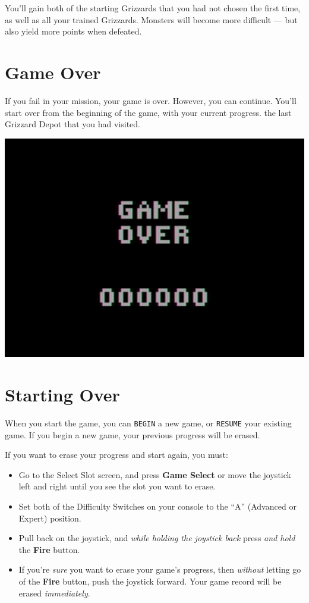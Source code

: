 \documentclass[9pt,twocolumn,openany,article]{memoir}
\newenvironment{ritemize}{\begin{itemize}\raggedright}{\end{itemize}}
\begin{document}
You'll gain both  of the starting Grizzards that you  had not chosen the
first time, as well as all  your trained Grizzards. Monsters will become
more difficult — but also yield more points when defeated.

\section{Game Over}

If  you fail  in  your mission,  your  game is  over.  However, you  can
continue. You'll start over from  \ifdefined\NOSAVE the beginning of the
game, with your current progress. \else the last Grizzard Depot that you
had visited. \fi

\begin{center}
  \includegraphics[width=.75\columnwidth]{../Manual/GameOverNTSC.png}
\end{center}

\section{Starting Over}\label{Starting Your Adventure Over}

\ifdefined\NOSAVE

When  you  start  the  game,  you can  \texttt{BEGIN}  a  new  game,  or
\texttt{RESUME}  your existing  game.  If  you begin  a  new game,  your
previous progress will be erased.

\else

If you want to erase your progress and start again, you must:

\begin{ritemize}
\item Go  to the Select Slot  screen, and press \textbf{Game  Select} or
  move  the joystick  left and  right until  you see  the slot  you want
  to erase.
\item Set both  of the Difficulty Switches on your  console to the ``A''
  (Advanced or Expert) position.
\item Pull  back on the  joystick, and \emph{while holding  the joystick
    back} press \emph{and hold} the \textbf{Fire} button.
\item If you're \emph{sure} you want to erase your game's progress, then
  \emph{without}  letting  go  of  the \textbf{Fire}  button,  push  the
  joystick  forward. \ifdefined\DEMO  Your  game record  will be  erased
  \emph{immediately}. \fi
\end{ritemize}
\end{document}
